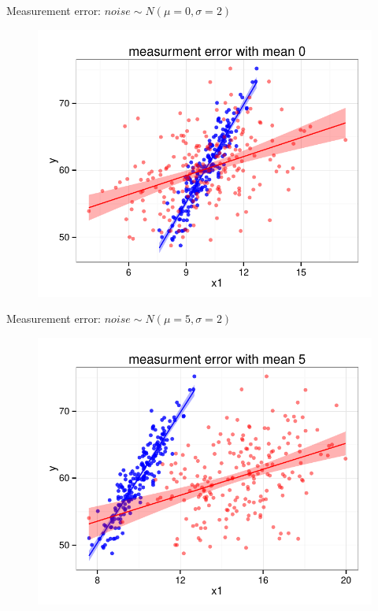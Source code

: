 \documentclass[handout]{beamer}
\begin{document}
\begin{frame}{Measurement error: $noise \sim N(\mu = 0,\sigma = 2)$}
\begin{figure}
\includegraphics[scale=0.8]{ols1.pdf}
\end{figure}
\end{frame}

\begin{frame}{Measurement error: $noise \sim N(\mu = 5,\sigma = 2)$}
\begin{figure}
\includegraphics[scale=0.8]{ols2.pdf}
\end{figure}
\end{frame}
\end{document}
